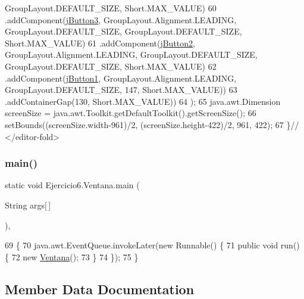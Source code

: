 \begin{DoxyCode}
      GroupLayout.DEFAULT\_SIZE, Short.MAX\_VALUE)
60                    .addComponent(\mbox{\hyperlink{class_ejercicio6_1_1_ventana_a5e56d7fdd53c855b57547c618c29838a}{jButton3}}, GroupLayout.Alignment.LEADING, GroupLayout.DEFAULT\_SIZE,
       GroupLayout.DEFAULT\_SIZE, Short.MAX\_VALUE)
61                    .addComponent(\mbox{\hyperlink{class_ejercicio6_1_1_ventana_a2ed2a64625ce0750faff659b6877db2a}{jButton2}}, GroupLayout.Alignment.LEADING, GroupLayout.DEFAULT\_SIZE,
       GroupLayout.DEFAULT\_SIZE, Short.MAX\_VALUE)
62                    .addComponent(\mbox{\hyperlink{class_ejercicio6_1_1_ventana_ad44d1eb3a44301c300133e494094fa82}{jButton1}}, GroupLayout.Alignment.LEADING, GroupLayout.DEFAULT\_SIZE,
       147, Short.MAX\_VALUE))
63                 .addContainerGap(130, Short.MAX\_VALUE))
64         );
65         java.awt.Dimension screenSize = java.awt.Toolkit.getDefaultToolkit().getScreenSize();
66         setBounds((screenSize.width-961)/2, (screenSize.height-422)/2, 961, 422);
67     \}\textcolor{comment}{// </editor-fold>}
\end{DoxyCode}
\mbox{\label{class_ejercicio6_1_1_ventana_ad8b396e48f768f227d519aa72bae8057}} 
\subsubsection{\texorpdfstring{main()}{main()}}
{\footnotesize\ttfamily static void Ejercicio6.\+Ventana.\+main (\begin{DoxyParamCaption}\item[{String}]{args\mbox{[}$\,$\mbox{]} }\end{DoxyParamCaption})\hspace{0.3cm}{\ttfamily [inline]}, {\ttfamily [static]}}


\begin{DoxyCode}
69                                            \{
70         java.awt.EventQueue.invokeLater(\textcolor{keyword}{new} Runnable() \{
71             \textcolor{keyword}{public} \textcolor{keywordtype}{void} run() \{
72                 \textcolor{keyword}{new} \mbox{\hyperlink{class_ejercicio6_1_1_ventana_ae3dbf01a448d02dcc9a5b858e902ca23}{Ventana}}();
73             \}
74         \});
75     \}
\end{DoxyCode}


\subsection{Member Data Documentation}
\mbox{\label{class_ejercicio6_1_1_ventana_ad44d1eb3a44301c300133e494094fa82}} 

